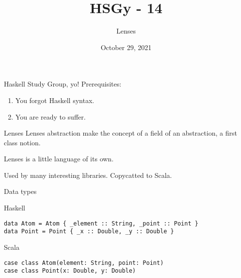 \documentclass[presentation,aspectratio=169,8pt]{beamer}
\date{October 29, 2021}
\title{HSGy - 14}
\subtitle{Lenses}
\begin{document}
\maketitle
\newcommand{\mathcolorbox}[2]{%
  \begingroup
  \setlength{\fboxsep}{2pt}%
  \colorbox{#1}{$\displaystyle #2$}%
  \endgroup
}


\begin{frame}[label={sec:orgb9ad417}]{Haskell Study Group, yo!}
Prerequisites:

\begin{enumerate}
\item You forgot Haskell syntax.
\item You are ready to suffer.
\end{enumerate}
\end{frame}

\begin{frame}[label={sec:org4a8c515}]{Lenses}
Lenses abstraction make the concept of a field of an abstraction, a first class
notion.

Lenses is a little language of its own.

Used by many interesting libraries. Copycatted to Scala.
\end{frame}

\begin{frame}[label={sec:org5dc8e90},fragile]{Data types}
 \begin{block}{Haskell}
\begin{verbatim}
data Atom = Atom { _element :: String, _point :: Point }
data Point = Point { _x :: Double, _y :: Double }
\end{verbatim}
\end{block}

\begin{block}{Scala}
\begin{verbatim}
case class Atom(element: String, point: Point)
case class Point(x: Double, y: Double)
\end{verbatim}
\end{block}
\end{frame}
\end{document}
